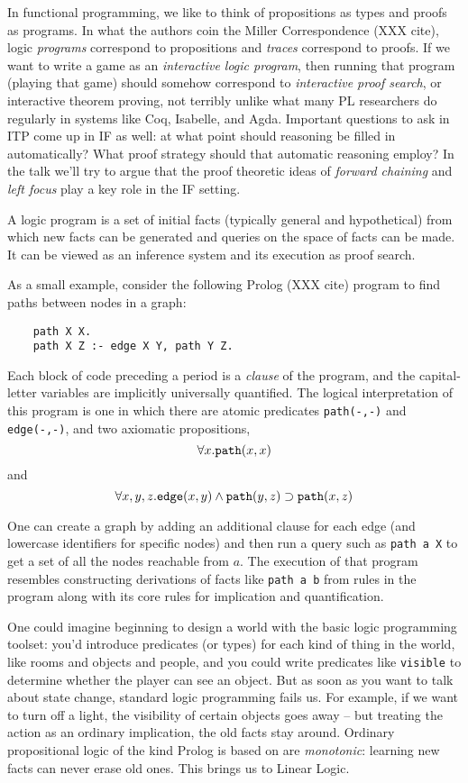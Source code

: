 \renewcommand{\implies}{\supset}

In functional programming, we like to think of propositions as
types and proofs as programs. In what the authors coin the Miller
Correspondence (XXX cite), logic {\em programs} correspond to propositions
and {\em traces} correspond to proofs. If we want to write a game as an
{\em interactive logic program}, then running that program (playing that
game) should somehow correspond to {\em interactive proof search}, or
interactive theorem proving, not terribly unlike what many PL researchers
do regularly in systems like Coq, Isabelle, and Agda. Important questions
to ask in ITP come up in IF as well: at what point should reasoning be
filled in automatically? What proof strategy should that automatic
reasoning employ? In the talk we'll try to argue that the proof theoretic
ideas of {\em forward chaining} and {\em left focus} play a key role in the
IF setting.

A logic program is a set of initial facts (typically general and
hypothetical) from which new facts can be generated and queries on the
space of facts can be made. It can be viewed as an inference system and its
execution as proof search.

As a small example, consider the following Prolog (XXX cite) program to
find paths between nodes in a graph:

\begin{verbatim}
    path X X.
    path X Z :- edge X Y, path Y Z.
\end{verbatim}

Each block of code preceding a period is a {\em clause} of the program, and
the capital-letter variables are implicitly universally quantified.
The logical interpretation of this program is one in which there are atomic
predicates \verb|path(-,-)| and \verb|edge(-,-)|, and two axiomatic
propositions, 
\[\forall x.\verb|path|(x, x)\] 
and 
\[\forall x,y,z.\verb|edge|(x, y) \land \verb|path|(y, z) \implies 
\verb|path|(x, z)\]

One can create a graph by adding an additional clause for each edge (and
lowercase identifiers for specific nodes) and then run a query such as
\verb|path a X| to get a set of all the nodes reachable from $a$. The
execution of that program resembles constructing derivations of facts like
\verb|path a b| from rules in the program along with its core rules for
implication and quantification.

One could imagine beginning to design a world with the basic logic
programming toolset: you'd introduce predicates (or types) for each kind of
thing in the world, like rooms and objects and people, and you could write
predicates like \verb|visible| to determine whether the player can see an
object. But as soon as you want to talk about state change, standard logic
programming fails us. For example, if we want to turn off a light, the
visibility of certain objects goes away -- but treating the action as an
ordinary implication, the old facts stay around. Ordinary propositional
logic of the kind Prolog is based on are {\em monotonic}: learning new
facts can never erase old ones. This brings us to Linear Logic.

